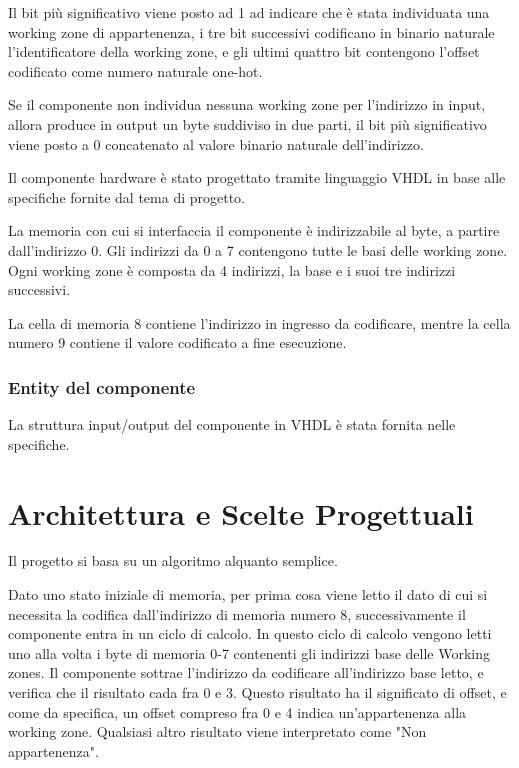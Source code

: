 \documentclass{article}
\begin{document}
 Il bit più significativo viene posto ad 1 ad indicare che è stata individuata una working zone di appartenenza, i tre bit successivi codificano in binario naturale l'identificatore della working zone, e gli ultimi quattro bit contengono l'offset codificato come numero naturale one-hot.

Se il componente non individua nessuna working zone per l'indirizzo in input, allora produce in output un byte suddiviso in due parti, il bit più significativo viene posto a 0 concatenato al valore binario naturale dell'indirizzo.

Il componente hardware è stato progettato tramite linguaggio VHDL in base alle specifiche fornite dal tema di progetto.

La memoria con cui si interfaccia il componente è indirizzabile al byte, a partire dall'indirizzo 0. Gli indirizzi da 0 a 7 contengono tutte le basi delle working zone. Ogni working zone è composta da 4 indirizzi, la base e i suoi tre indirizzi successivi.

La cella di memoria 8 contiene l'indirizzo in ingresso da codificare, mentre la cella numero 9 contiene il valore codificato a fine esecuzione.

\subsubsection{Entity del componente}

La struttura input/output del componente in VHDL è stata fornita nelle specifiche.




\section{Architettura e Scelte Progettuali}

Il progetto si basa su un algoritmo alquanto semplice.

Dato uno stato iniziale di memoria, per prima cosa viene letto il dato di cui si necessita la codifica dall'indirizzo di memoria numero 8, successivamente il componente entra in un ciclo di calcolo. In questo ciclo di calcolo vengono letti uno alla volta i byte di memoria 0-7 contenenti gli indirizzi base delle Working zones. Il componente sottrae l'indirizzo da codificare all'indirizzo base letto, e verifica che il risultato cada fra 0 e 3. Questo risultato ha il significato di offset, e come da specifica, un offset compreso fra 0 e 4 indica un'appartenenza alla working zone. Qualsiasi altro risultato viene interpretato come "Non appartenenza".
\end{document}

